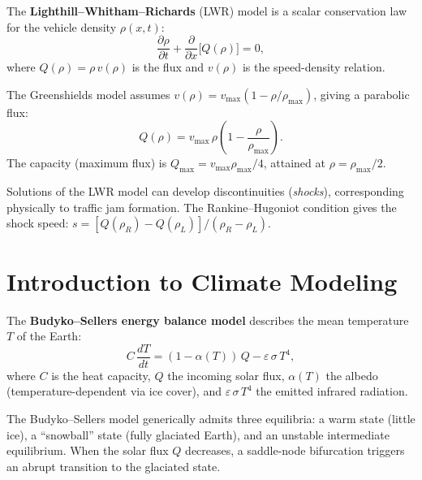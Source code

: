 \begin{definition}
The \textbf{Lighthill--Whitham--Richards} (LWR) model is a scalar
conservation law for the vehicle density $\rho(x,t)$:
\[
  \frac{\partial \rho}{\partial t} +
  \frac{\partial}{\partial x}\bigl[Q(\rho)\bigr] = 0,
\]
where $Q(\rho) = \rho\,v(\rho)$ is the flux and $v(\rho)$ is the
speed-density relation.
\end{definition}

\begin{proposition}
The Greenshields model assumes $v(\rho) = v_{\max}(1 - \rho/\rho_{\max})$,
giving a parabolic flux:
\[
  Q(\rho) = v_{\max}\,\rho\left(1 - \frac{\rho}{\rho_{\max}}\right).
\]
The capacity (maximum flux) is $Q_{\max} = v_{\max}\rho_{\max}/4$,
attained at $\rho = \rho_{\max}/2$.
\end{proposition}

\begin{remark}
Solutions of the LWR model can develop discontinuities (\emph{shocks}),
corresponding physically to traffic jam formation. The
Rankine--Hugoniot condition gives the shock
speed: $s = [Q(\rho_R) - Q(\rho_L)]/(\rho_R - \rho_L)$.
\end{remark}

\section{Introduction to Climate Modeling}
\label{sec:climate}

\begin{definition}
The \textbf{Budyko--Sellers energy balance model} describes
the mean temperature $T$ of the Earth:
\[
  C\,\frac{dT}{dt} = (1 - \alpha(T))\,Q - \varepsilon\,\sigma\,T^4,
\]
where $C$ is the heat capacity, $Q$ the incoming solar flux,
$\alpha(T)$ the albedo (temperature-dependent via ice cover), and
$\varepsilon\,\sigma\,T^4$ the emitted infrared radiation.
\end{definition}

\begin{theorem}
The Budyko--Sellers model generically admits three equilibria: a warm
state (little ice), a ``snowball'' state (fully glaciated Earth), and
an unstable intermediate equilibrium. When the solar flux $Q$ decreases,
a saddle-node bifurcation triggers an abrupt transition to the glaciated state.
\end{theorem}

